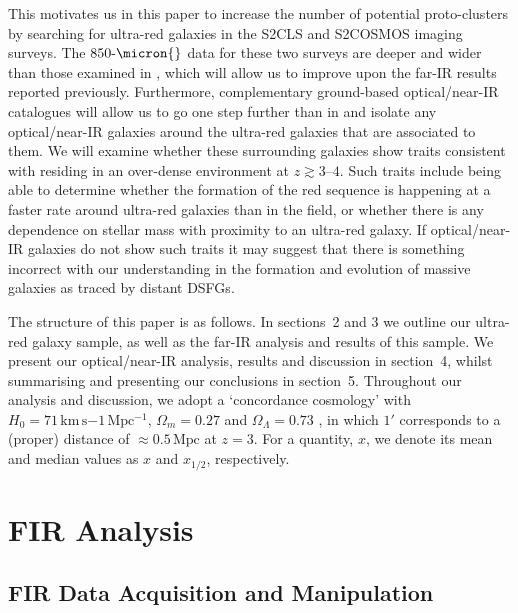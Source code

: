 \documentclass[a4paper, fleqn, usenatbib]{mnras}
\newcommand{\megaparsec}{\text{Mpc}}
\newcommand{\urg}{ultra-red galaxy}
\newcommand{\urgs}{ultra-red galaxies}
\begin{document}
This motivates us in this paper to increase the number of potential proto-clusters by searching for ultra-red galaxies in the S2CLS and S2COSMOS imaging surveys.
The $850\text{-}\micron{}$ data for these two surveys are deeper and wider than those examined in , which will allow us to improve upon the far-IR results reported previously.
Furthermore, complementary ground-based optical/near-IR catalogues will allow us to go one step further than in  and isolate any optical/near-IR galaxies around the \urgs{} that are associated to them.
We will examine whether these surrounding galaxies show traits consistent with residing in an over-dense environment at $z\gtrsim3\text{--}4$.
Such traits include being able to determine whether the formation of the red sequence is happening at a faster rate around \urgs{} than in the field, or whether there is any dependence on stellar mass with proximity to an \urg{}.
If optical/near-IR galaxies do not show such traits it may suggest that there is something incorrect with our understanding in the formation and evolution of massive galaxies as traced by distant DSFGs.

The structure of this paper is as follows.
In sections~2 and 3 we outline our ultra-red galaxy sample, as well as the far-IR analysis and results of this sample.
We present our optical/near-IR analysis, results and discussion in section~4, whilst summarising and presenting our conclusions in section~5.
Throughout our analysis and discussion, we adopt a `concordance cosmology' with $H_0=71\,\text{km}\,\text{s}{-1}\,\megaparsec{}^{-1}$, $\Omega_{m} = 0.27$ and $\Omega_\Lambda = 0.73$ \citep{hinshaw09}, in which $1'$ corresponds to a (proper) distance of $\approx0.5\,\megaparsec{}$ at $z = 3$.
For a quantity, $x$, we denote its mean and median values as $x$ and $x_{1/2}$, respectively.


\section{FIR Analysis}
\label{sec:fir_analysis}

\subsection{FIR Data Acquisition and Manipulation}
\end{document}
